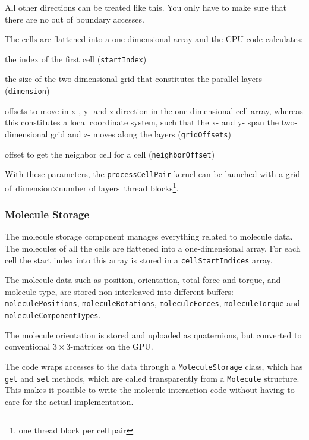 All other directions can be treated like this. You only have to make sure that there are no out of boundary accesses.

The cells are flattened into a one-dimensional array and the CPU code calculates:
\begin{compactitem}
\item the index of the first cell (\lstinline!startIndex!)
\item the size of the two-dimensional grid that constitutes the parallel layers (\lstinline!dimension!)
\item offsets to move in x-, y- and z-direction in the one-dimensional cell array, whereas this constitutes a local coordinate system, such that the x- and y- span the two-dimensional grid and z- moves along the layers (\lstinline!gridOffsets!)
\item offset to get the neighbor cell for a cell (\lstinline!neighborOffset!)
\end{compactitem}
With these parameters, the \lstinline!processCellPair! kernel can be launched with a grid of $ \text{dimension} \times \text{number of layers} $ thread blocks\footnote{one thread block per cell pair}.

\subsubsection{Molecule Storage}
The molecule storage component manages everything related to molecule data. The molecules of all the cells are flattened into a one-dimensional array. For each cell the start index into this array is stored in a \lstinline!cellStartIndices! array. 

The molecule data such as position, orientation, total force and torque, and molecule type, are stored non-interleaved into different buffers: \lstinline!moleculePositions!, \lstinline!moleculeRotations!, \lstinline!moleculeForces!, \lstinline!moleculeTorque! and \lstinline!moleculeComponentTypes!.

The molecule orientation is stored and uploaded as quaternions, but converted to conventional $ 3 \times 3 $-matrices on the GPU.

The \cuda{} code wraps accesses to the data through a \lstinline!MoleculeStorage! class, which has \lstinline!get! and \lstinline!set! methods, which are called transparently from a \lstinline!Molecule! structure. This makes it possible to write the molecule interaction code without having to care for the actual implementation.

